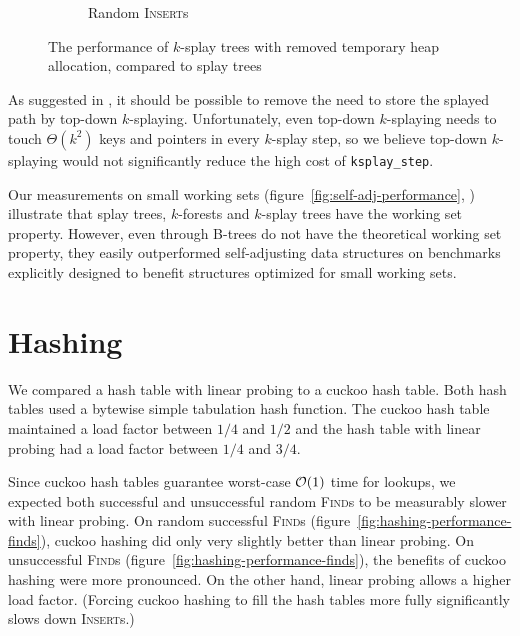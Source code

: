 \begin{figure}
\begin{subfigure}[t]{0.48\textwidth}
	\caption{Random \textsc{Insert}s}
\end{subfigure}
\caption{The performance of $k$-splay trees with removed temporary heap
	allocation, compared to splay trees}
\label{fig:ksplay-noalloc}
\end{figure}

As suggested in \cite{ksplay-sherk}, it should be possible to remove the
need to store the splayed path by top-down \mbox{$k$-splaying}.
Unfortunately, even top-down \mbox{$k$-splaying} needs to touch
$\Theta(k^2)$ keys and pointers in every $k$-splay step, so we believe top-down
\mbox{$k$-splaying} would not significantly reduce the high cost of
\texttt{ksplay\_step}.

Our measurements on small working sets
(figure~\ref{fig:self-adj-performance},
) illustrate that splay trees, $k$-forests
and $k$-splay trees have the working set property.
However, even through \mbox{B-trees} do not have the theoretical working set
property, they easily outperformed self-adjusting data structures on
benchmarks explicitly designed to benefit structures optimized for small
working sets.

\section{Hashing}
\label{sec:hashing-results}
We compared a hash table with linear probing to a cuckoo hash table.
Both hash tables used a bytewise simple tabulation hash function.
The cuckoo hash table maintained a load factor between $1/4$ and
$1/2$ and the hash table with linear probing had a load factor
between $1/4$ and $3/4$.

Since cuckoo hash tables guarantee worst-case $\mathcal{O}(1)$ time for lookups,
we expected both successful and unsuccessful random \textsc{Find}s to be
measurably slower with linear probing.
On random successful \textsc{Find}s (figure~\ref{fig:hashing-performance-finds}),
cuckoo hashing did only very slightly better than linear probing.
On unsuccessful \textsc{Find}s (figure~\ref{fig:hashing-performance-finds}),
the benefits of cuckoo hashing were more pronounced.
On the other hand, linear probing allows a higher load factor.
(Forcing cuckoo hashing to fill the hash tables more fully significantly
slows down \textsc{Insert}s.)


